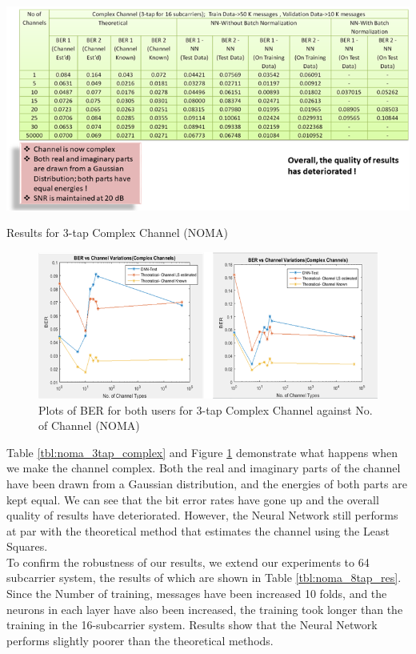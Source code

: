 \begin{table}[htbp]
  \centering
  \includegraphics[width=\textwidth]{./Figures/noma_3tap_complex.png}
  \caption{Results for 3-tap Complex Channel (NOMA)}
  \label{tbl:noma_3tap_complex}
\end{table}
\begin{figure}[htbp]
  \centering
  \includegraphics[width=\textwidth]{./Figures/noma_3tap_complexnochannel.png}
  \caption{Plots of BER for both users for 3-tap Complex Channel against No. of Channel (NOMA)}
  \label{fig:noma_3tap_complexnochannel}
\end{figure}
Table \ref{tbl:noma_3tap_complex} and Figure \ref{fig:noma_3tap_complexnochannel} demonstrate what happens when we make the channel complex. Both the real and imaginary parts of the channel have been drawn from a Gaussian distribution, and the energies of both parts are kept equal. We can see that the bit error rates have gone up and the overall quality of results have deteriorated. However, the Neural Network still performs at par with the theoretical method that estimates the channel using the Least Squares. \\
To confirm the robustness of our results, we extend our experiments to 64 subcarrier system, the results of which are shown in Table \ref{tbl:noma_8tap_res}. Since the Number of training, messages have been increased 10 folds, and the neurons in each layer have also been increased, the training took longer than the training in the 16-subcarrier system. Results show that the Neural Network performs slightly poorer than the theoretical methods.
